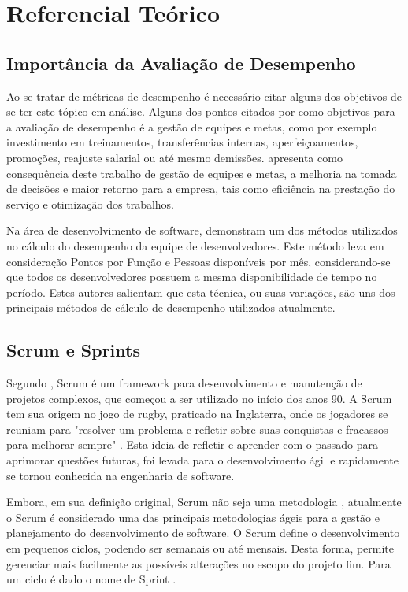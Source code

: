 \section{Referencial Teórico}

\subsection{ Importância da Avaliação de Desempenho}
Ao se tratar de métricas de desempenho é necessário citar alguns dos objetivos de se ter este tópico em análise. Alguns dos pontos citados por  como objetivos para a avaliação de desempenho é a gestão de equipes e metas, como por exemplo investimento em treinamentos, transferências internas, aperfeiçoamentos, promoções, reajuste salarial ou até mesmo demissões.  apresenta como consequência deste trabalho de gestão de equipes e metas, a melhoria na tomada de decisões e maior retorno para a empresa, tais como eficiência na prestação do serviço e otimização dos trabalhos.\par
Na área de desenvolvimento de software,  demonstram um dos métodos utilizados no cálculo do desempenho da equipe de desenvolvedores. Este método leva em consideração Pontos por Função e Pessoas disponíveis por mês, considerando-se que todos os desenvolvedores possuem a mesma disponibilidade de tempo no período. Estes autores salientam que esta técnica, ou suas variações, são uns dos principais métodos de cálculo de desempenho utilizados atualmente.

\subsection{Scrum e Sprints}
Segundo , Scrum é um framework para desenvolvimento e manutenção de projetos complexos, que começou a ser utilizado no início dos anos 90. A Scrum tem sua origem no jogo de rugby, praticado na Inglaterra, onde os jogadores se reuniam para "resolver um problema e refletir sobre suas conquistas e fracassos para melhorar sempre" \cite{scrumatlassian}. Esta ideia de refletir e aprender com o passado para aprimorar questões futuras, foi levada para o desenvolvimento ágil e rapidamente se tornou conhecida na engenharia de software.\par 

Embora, em sua definição original, Scrum não seja uma metodologia \cite{scrumguide}, atualmente o Scrum é considerado uma das principais metodologias ágeis para a gestão e planejamento do desenvolvimento de software. O Scrum define o desenvolvimento em pequenos ciclos, podendo ser semanais ou até mensais. Desta forma, permite gerenciar mais facilmente as possíveis alterações no escopo do projeto fim. Para um ciclo é dado o nome de Sprint \cite{scrum}.\par

